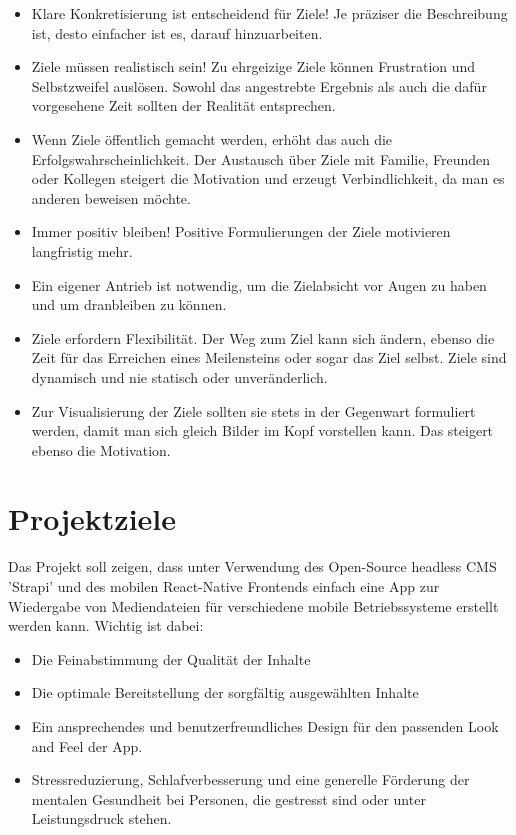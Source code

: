 \begin{itemize}
    \item Klare Konkretisierung ist entscheidend für Ziele! Je präziser die Beschreibung ist, desto einfacher
          ist es, darauf hinzuarbeiten.
    \item Ziele müssen realistisch sein! Zu ehrgeizige Ziele können Frustration und Selbstzweifel
          auslösen. Sowohl das angestrebte Ergebnis als auch die dafür vorgesehene Zeit sollten der Realität
          entsprechen.
    \item Wenn Ziele öffentlich gemacht werden, erhöht das auch die Erfolgswahrscheinlichkeit. Der Austausch
          über Ziele mit Familie, Freunden oder Kollegen steigert die Motivation und erzeugt Verbindlichkeit, da
          man es anderen beweisen möchte.
    \item Immer positiv bleiben! Positive Formulierungen der Ziele motivieren langfristig mehr.
    \item Ein eigener Antrieb ist notwendig, um die Zielabsicht vor Augen zu haben und um dranbleiben zu
          können.
    \item Ziele erfordern Flexibilität. Der Weg zum Ziel kann sich ändern, ebenso die Zeit für das Erreichen
          eines Meilensteins oder sogar das Ziel selbst. Ziele sind dynamisch und nie statisch oder unveränderlich.
    \item Zur Visualisierung der Ziele sollten sie stets in der Gegenwart formuliert werden, damit man sich
          gleich Bilder im Kopf vorstellen kann. Das steigert ebenso die Motivation.
\end{itemize}

\section{Projektziele}
Das Projekt soll zeigen, dass unter Verwendung des Open-Source headless CMS 'Strapi' und des mobilen
React-Native Frontends einfach eine App zur Wiedergabe von Mediendateien für verschiedene mobile Betriebssysteme
erstellt werden kann. Wichtig ist dabei: 

\begin{itemize}
    \item Die Feinabstimmung der Qualität der Inhalte
    \item Die optimale Bereitstellung der sorgfältig ausgewählten Inhalte
    \item Ein ansprechendes und benutzerfreundliches Design für den passenden Look and Feel der App.
    \item Stressreduzierung, Schlafverbesserung und eine generelle Förderung der mentalen Gesundheit bei
          Personen, die gestresst sind oder unter Leistungsdruck stehen.
\end{itemize}

